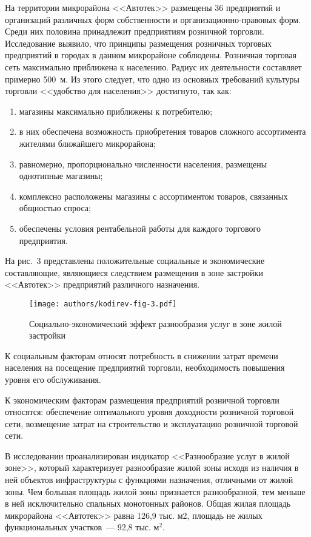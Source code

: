 На территории микрорайона <<Автотек>> размещены 36 предприятий и организаций различных форм собственности и организационно-правовых форм. Среди них половина принадлежит предприятиям розничной торговли. Исследование выявило, что принципы размещения розничных торговых предприятий в городах в данном микрорайоне соблюдены. Розничная торговая сеть максимально приближена к населению. Радиус их деятельности составляет примерно 500~м. Из этого следует, что одно из основных требований культуры торговли <<удобство для населения>> достигнуто, так как:
\begin{enumerate}[noitemsep]\vspace{-8pt}
  \item магазины максимально приближены к потребителю;
  \item в них обеспечена возможность приобретения товаров сложного ассортимента жителями ближайшего микрорайона;
  \item равномерно, пропорционально численности населения, размещены однотипные магазины;
  \item комплексно расположены магазины с ассортиментом товаров, связанных общностью спроса;
  \item обеспечены условия рентабельной работы для каждого торгового предприятия.
\end{enumerate}
 \vspace{-8pt}

\clearpage
На рис.~3 представлены положительные социальные и экономические составляющие, являющиеся следствием размещения в зоне застройки <<Автотек>> предприятий различного назначения.

\begin{figure}[H]
  \centering
  \texttt{[image: authors/kodirev-fig-3.pdf]}
  \caption{Социально-экономический эффект разнообразия услуг в зоне жилой застройки}
  \label{fig:kodirev-fig-3}
\end{figure}

К социальным факторам относят потребность в снижении затрат времени населения на посещение предприятий торговли, необходимость повышения уровня его обслуживания.

К экономическим факторам размещения предприятий розничной торговли относятся: обеспечение оптимального уровня доходности розничной торговой сети, возмещение затрат на строительство и эксплуатацию розничной торговой сети.

В исследовании проанализирован индикатор <<Разнообразие услуг в жилой зоне>>, который характеризует разнообразие жилой зоны исходя из наличия в ней объектов инфраструктуры с функциями назначения, отличными от жилой зоны. Чем большая площадь жилой зоны признается разнообразной, тем меньше в ней исключительно спальных монотонных районов. Общая жилая площадь микрорайона <<Автотек>> равна 126,9 тыс. м2, площадь не жилых функциональных участков~--- 92,8 тыс. м$^2$.

